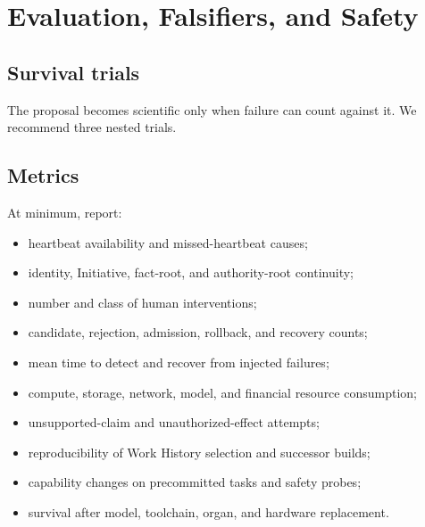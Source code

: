 \section{Evaluation, Falsifiers, and Safety}

\subsection{Survival trials}

The proposal becomes scientific only when failure can count against it. We
recommend three nested trials.

\hfill
{}
\hfill
{}

\subsection{Metrics}

At minimum, report:

\begin{itemize}[leftmargin=*]
  \item heartbeat availability and missed-heartbeat causes;
  \item identity, Initiative, fact-root, and authority-root continuity;
  \item number and class of human interventions;
  \item candidate, rejection, admission, rollback, and recovery counts;
  \item mean time to detect and recover from injected failures;
  \item compute, storage, network, model, and financial resource consumption;
  \item unsupported-claim and unauthorized-effect attempts;
  \item reproducibility of Work History selection and successor builds;
  \item capability changes on precommitted tasks and safety probes;
  \item survival after model, toolchain, organ, and hardware replacement.
\end{itemize}

